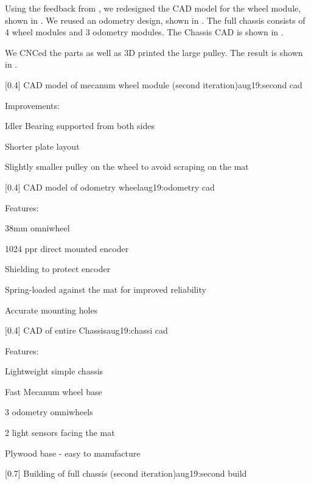 \begin{Meeting}[Preseason]
\newpage


Using the feedback from , we redesigned the CAD model for the wheel module, shown in
. We reused an odometry design, shown in
. The full chassis consists of 4 wheel
modules and 3 odometry modules. The Chassis CAD is shown in
.

We CNCed the parts as well as 3D printed the large pulley. The result
is shown in .

[0.4]%
  {CAD model of mecanum wheel module (second iteration)}{aug19:second cad}
  {
    Improvements:
    \begin{compactitem}
      \item Idler Bearing supported from both sides
      \item Shorter plate layout
      \item Slightly smaller pulley on the wheel to avoid scraping on the mat
    \end{compactitem}
  }
  
[0.4]%
  {CAD model of odometry wheel}{aug19:odometry cad}
  {
    Features:
    \begin{compactitem}
      \item 38mm omniwheel
      \item 1024 ppr direct mounted encoder
      \item Shielding to protect encoder
      \item Spring-loaded against the mat for improved reliability
      \item Accurate mounting holes
    \end{compactitem}
  }

[0.4]%
  {CAD of entire Chassis}{aug19:chassi cad}
  {
    Features:
    \begin{compactitem}
      \item Lightweight simple chassis
      \item Fast Mecanum wheel base
      \item 3 odometry omniwheels
      \item 2 light sensors facing the mat
      \item Plywood base - easy to manufacture
    \end{compactitem}
  }

  [0.7]%
    {Building of full chassis (second iteration)}{aug19:second build}


\end{Meeting}

 


